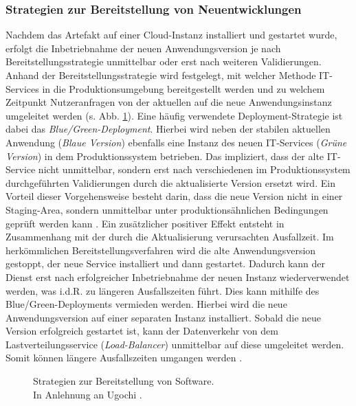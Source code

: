 \subsubsection{Strategien zur Bereitstellung von Neuentwicklungen}
\label{sec:Bereitstellungs_Strategien}
Nachdem das Artefakt auf einer Cloud-Instanz installiert und gestartet wurde, erfolgt die Inbetriebnahme der neuen Anwendungsversion je nach Bereitstellungsstrategie unmittelbar oder erst nach weiteren Validierungen. Anhand der Bereitstellungsstrategie wird festgelegt, mit welcher Methode IT-Services in die Produktionsumgebung bereitgestellt werden und zu welchem Zeitpunkt Nutzeranfragen von der aktuellen auf die neue Anwendungsinstanz umgeleitet werden (s. Abb. \ref{fig:DS}).
Eine häufig verwendete Deployment-Strategie ist dabei das \textit{Blue/Green-Deployment}. Hierbei wird neben der stabilen aktuellen Anwendung (\textit{Blaue Version}) ebenfalls eine Instanz des neuen IT-Services (\textit{Grüne Version}) in dem Produktionssystem betrieben. Das impliziert, dass der alte IT-Service nicht unmittelbar, sondern erst nach verschiedenen im Produktionssystem durchgeführten Validierungen durch die aktualisierte Version ersetzt wird. Ein Vorteil dieser Vorgehensweise besteht darin, dass die neue Version nicht in einer Staging-Area, sondern unmittelbar unter produktionsähnlichen Bedingungen geprüft werden kann \cite{Ugochi.20220503}. Ein zusätzlicher positiver Effekt entsteht in Zusammenhang mit der durch die Aktualisierung verursachten Ausfallzeit. Im herkömmlichen Bereitstellungsverfahren wird die alte Anwendungsversion gestoppt, der neue Service installiert und dann gestartet. Dadurch kann der Dienst erst nach erfolgreicher Inbetriebnahme der neuen Instanz wiederverwendet werden, was i.d.R. zu längeren Ausfallszeiten führt. Dies kann mithilfe des Blue/Green-Deployments vermieden werden. Hierbei wird die neue Anwendungsversion  auf einer separaten Instanz installiert. Sobald die neue Version erfolgreich gestartet ist, kann der Datenverkehr von dem Lastverteilungsservice (\textit{Load-Balancer}) unmittelbar auf diese umgeleitet werden. Somit können längere Ausfallszeiten umgangen werden \cite[1083]{Rudrabhatla.10720201092020}. 
\begin{center}
	\begin{figure}[H]
		\centering
		\caption[Strategien zur Bereitstellung von Software]{Strategien zur Bereitstellung von Software.\\ In Anlehnung an Ugochi \cite{Ugochi.20220503}.}
		\label{fig:DS}
	\end{figure}
\end{center}
